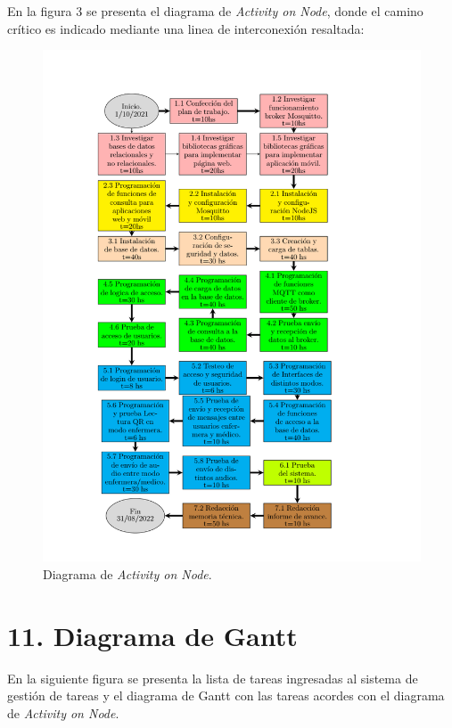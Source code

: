 \documentclass[
11pt, %
]{charter}
\begin{document}
En la figura 3 se presenta el diagrama de \textit{Activity on Node}, donde el camino crítico es indicado mediante una linea de interconexión resaltada:
\begin{figure}[htpb]
\centering 
\includegraphics[width=.8\textwidth]{./Figuras/diagramaAoN.png}
\caption{Diagrama de \textit{Activity on Node}.}
\label{fig:AoN}
\end{figure}


\section{11. Diagrama de Gantt}
\label{sec:gantt}
En la siguiente figura se presenta la lista de tareas ingresadas al sistema de gestión de tareas y el diagrama de Gantt con las tareas acordes con el diagrama de \textit{Activity on Node}.
\end{document}
